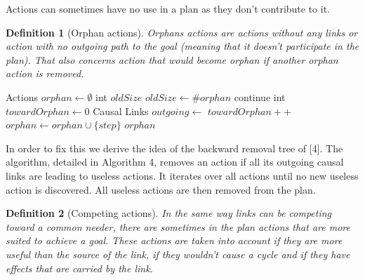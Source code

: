 \documentclass[]{article}
\newtheorem{definition}{Definition}
\begin{document}
Actions can sometimes have no use in a plan as they don't contribute to
it.

\begin{definition}[Orphan actions]

Orphans actions are actions without any links or action with no outgoing
path to the goal (meaning that it doesn't participate in the plan). That
also concerns action that would become orphan if another orphan action
is removed.

\end{definition}

\begin{algorithm}\caption{Orphan actions finding}\label{orphanaction_find}\begin{algorithmic}[1]

 \State Actions
\(orphan \gets \emptyset\) \State int \(oldSize\) \Repeat
        \State \(oldSize \gets \#orphan\)
 
\State continue \EndIf
            \State int \(towardOrphan \gets 0\) \State Causal Links
\(outgoing \gets\) \protect{}
 
\State \(towardOrphan ++\) \EndIf
            \EndFor
\State \(orphan \gets orphan \cup \{step\}\) \EndIf
        \EndFor
     \State \Return \(orphan\)
\EndFunction

\end{algorithmic}\end{algorithm}

In order to fix this we derive the idea of the backward removal tree of
{[}4{]}. The algorithm, detailed in Algorithm 4, removes an action if
all its outgoing causal links are leading to useless actions. It
iterates over all actions until no new useless action is discovered. All
useless actions are then removed from the plan.

\begin{definition}[Competing actions]

In the same way links can be competing toward a common needer, there are
sometimes in the plan actions that are more suited to achieve a goal.
These actions are taken into account if they are more useful than the
source of the link, if they wouldn't cause a cycle and if they have
effects that are carried by the link.

\end{definition}
\end{document}
